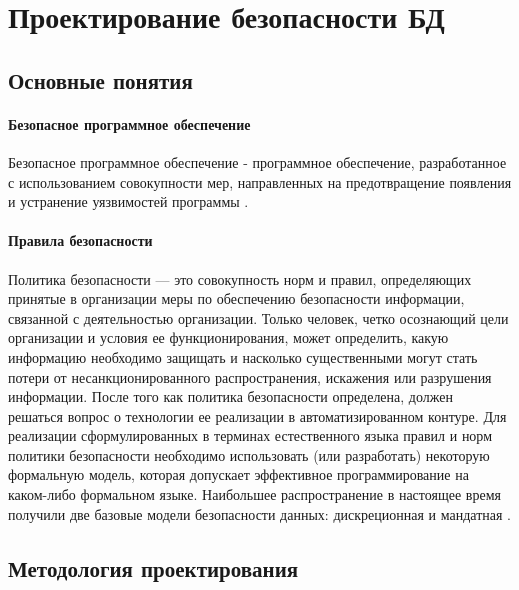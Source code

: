 \section{Проектирование безопасности БД}

\subsection{Основные понятия}

\paragraph{Безопасное программное обеспечение}
Безопасное программное обеспечение - программное обеспечение, разработанное с использованием совокупности
мер, направленных на предотвращение появления и устранение уязвимостей программы \autocite[с. 2]{GOST50939}.

\paragraph{Правила безопасности}
Политика безопасности — это совокупность норм и правил, определяющих принятые в организации меры по
обеспечению безопасности информации, связанной с деятельностью организации. Только человек, четко
осознающий цели организации и условия ее функционирования, может определить, какую информацию
необходимо защищать и насколько существенными могут стать потери от несанкционированного
распространения, искажения или разрушения информации. После того как политика безопасности
определена, должен решаться вопрос о технологии ее реализации в автоматизированном контуре.
Для реализации сформулированных в терминах естественного языка правил и норм политики
безопасности необходимо использовать (или разработать) некоторую формальную модель,
которая допускает эффективное программирование на каком-либо формальном языке.
Наибольшее распространение в настоящее время получили две базовые модели безопасности
данных: дискреционная и мандатная \autocite{shveikin}.

\subsection{Методология проектирования}

